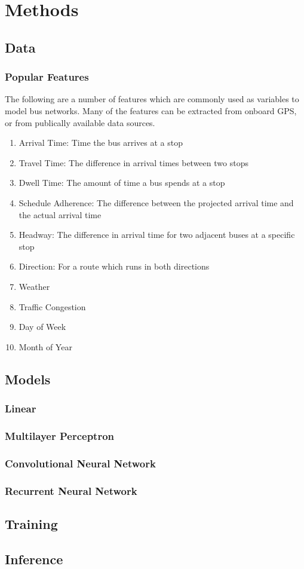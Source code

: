 \chapter{Methods}
\section{Data}\label{data}

\subsection{Popular Features}

The following are a number of features which are commonly used as variables to model bus networks.
Many of the features can be extracted from onboard GPS, or from publically available data sources.

\begin{enumerate}
  \item Arrival Time: Time the bus arrives at a stop
  \item Travel Time: The difference in arrival times between two stops
  \item Dwell Time: The amount of time a bus spends at a stop
  \item Schedule Adherence: The difference between the projected arrival time and the actual arrival time
  \item Headway: The difference in arrival time for two adjacent buses at a specific stop
  \item Direction: For a route which runs in both directions
  \item Weather
  \item Traffic Congestion
  \item Day of Week
  \item Month of Year
\end{enumerate}

\section{Models}\label{models}
\subsection{Linear}
\subsection{Multilayer Perceptron}
\subsection{Convolutional Neural Network}
\subsection{Recurrent Neural Network}
\section{Training}\label{training}
\section{Inference}\label{inference}
